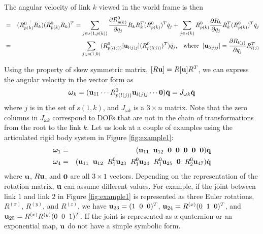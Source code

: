 The angular velocity of link $k$ viewed in the world frame is then
\begin{eqnarray}
[\bm{\omega}_k] & = & \dot{(R^0_{p(k)}R_k)} (R^0_{p(k)}R_k)^T = \sum_{j \in s(1,p(k))}
\frac{\partial R^0_{p(k)}}{\partial q_j} R_k R_k^T (R^0_{p(k)})^T
\dot{q}_j + \sum_{j \in s(k)} R^0_{p(k)} \frac{\partial R_k}{\partial q_j} R_k^T
(R^0_{p(k)})^T \dot{q}_j  \nonumber \\
& = & \sum_{j \in s(1,k)} (R^0_{p(l(j))} [\vc{u}_{l(j)j}] (R^0_{p(l(j))})^T) \dot{q}_j, \;\;\;\mathrm{where}\;\;
[\vc{u}_{l(j)j}] = \frac{\partial R_{l(j)}}{\partial q_j} R_{l(j)}^T
\end{eqnarray}

Using the property of skew symmetric matrix, $[R \mathbf{u}] = R [\mathbf{u}]
R^T$, we can express the angular velocity in the vector form as
\begin{equation}
\label{eqn:angular_velocity}
\bm{\omega}_k = (\mathbf{u}_{11} \cdots R^0_{p(l(j))} \mathbf{u}_{l(j)j} \cdots \mathbf{0}) \dot{\mathbf{q}} = J_{\omega k} \dot{\mathbf{q}}
\end{equation}
where $j$ is in the set of $s(1,k)$, and $J_{\omega k}$ is a $3 \times
n$ matrix. Note that the zero columns in $J_{\omega k}$ correspond to
DOFs that are not in the chain of transformations from the root to the
link $k$. Let us look at a couple of examples using the articulated
rigid body system in Figure \ref{fig:example1}:
\begin{eqnarray}
\bm{\omega}_1 &=& (\mathbf{u}_{11} \;\; \mathbf{u}_{12} \;\; \mathbf{0}
\;\;\mathbf{0}\;\;\mathbf{0}\;\;\mathbf{0}\;\;\mathbf{0}) \dot{\mathbf{q}}  \nonumber \\
\bm{\omega}_4 &=& (\mathbf{u}_{11} \;\; \mathbf{u}_{12} \;\; R^0_1\mathbf{u}_{23} \;\;
R^0_1\mathbf{u}_{24} \;\;  R^0_1\mathbf{u}_{25} \;\; \mathbf{0} \;\;
R^0_2 \mathbf{u}_{47}) \dot{\mathbf{q}} \nonumber
\end{eqnarray}
where $\mathbf{u}$, $R\mathbf{u}$, and $\mathbf{0}$ are all $3\times 1$
vectors. Depending on the representation of the rotation matrix,
$\mathbf{u}$ can assume different values. For example, if the joint
between link $1$ and link $2$ in Figure \ref{fig:example1} is
represented as three Euler rotations, $R^{(x)}$, $R^{(y)}$, and
$R^{(z)}$, we have $\mathbf{u}_{23} = (1\;\; 0 \;\; 0)^T$, $\mathbf{u}_{24} =
R^{(x)} (0\;\;1\;\;0)^T$, and $\mathbf{u}_{25} = R^{(x)}R^{(y)}
(0\;\;0\;\;1)^T$. If the joint is represented as a quaternion or an
exponential map, $\mathbf{u}$ do not have a simple symbolic form.

